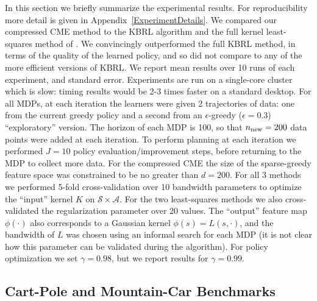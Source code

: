 \documentclass[letterpaper]{article}
\newcommand{\GrunewalderEmbeddingsRL}{GrunewalderEmbeddingsMDP}
\newcommand{\OrmoneitKBRL}{DBLP:journals/ml/OrmoneitS02}
\newcommand{\cA}{{\mathcal A}}
\newcommand{\cS}{{\mathcal S}}
\begin{document}
In this section we briefly summarize the experimental results. For reproducibility more detail is given in Appendix~\ref{ExperimentDetails}. We compared our compressed CME method to the KBRL algorithm \citep{\OrmoneitKBRL} and the full kernel least-squares method of \citet{\GrunewalderEmbeddingsRL}. We convincingly outperformed the full KBRL method, in terms of the quality of the learned policy, and so did not compare to any of the more efficient versions of KBRL. We report mean results over 10 runs of each experiment, and standard error. Experiments are run on a single-core cluster which is slow: timing results would be 2-3 times faster on a standard desktop. For all MDPs, at each iteration the learners were given 2 trajectories of data: one from the current greedy policy and a second from an $\epsilon$-greedy ($\epsilon = 0.3$) ``exploratory'' version. The horizon of each MDP is 100, so that $n_{\rm new} = 200$ data points were added at each iteration. To perform planning at each iteration we performed $J=10$ policy evaluation/improvement steps, before returning to the MDP to collect more data. For the compressed CME the size of the sparse-greedy feature space was constrained to be no greater than $d=200$. For all 3 methods we performed 5-fold cross-validation over 10 bandwidth parameters to optimize the ``input'' kernel $K$ on $\cS\times\cA$. For the two least-squares methods we also cross-validated the regularization parameter over 20 values. The ``output'' feature map $\phi(\cdot)$ also corresponds to a Gaussian kernel $\phi(s) = L(s,\cdot)$, and the bandwidth of $L$ was chosen using an informal search for each MDP (it is not clear how this parameter can be validated during the algorithm). For policy optimization we set $\gamma=0.98$, but we report results for $\gamma=0.99$.

\subsection{Cart-Pole and Mountain-Car Benchmarks}
\end{document}

